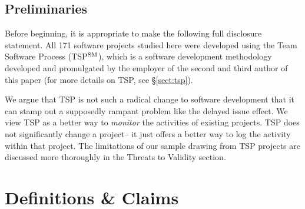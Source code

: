 \documentclass[smallcondensed]{svjour3}
\newcommand{\tion}[1]{\S\ref{sect:#1}}
\begin{document}
\subsection{Preliminaries}\label{sect:nontsp}
Before beginning, it is appropriate to make the following full disclosure statement. 
All 171 software projects
studied here were developed using the Team Software Process (TSP$\textsuperscript{SM}$), which is a software development methodology
developed and promulgated by the employer of the second and third author of this paper (for more details on TSP,
 see \tion{tsp}).

We argue that TSP is not such a radical change to software development that it can
stamp out a supposedly rampant problem like the delayed issue effect. We view TSP as a better way to
 {\em monitor} the activities   of  existing projects.  TSP
 does not significantly change a project-- it just offers a better way to log the activity within
 that project. The limitations of our sample drawing from TSP projects are discussed more thoroughly in the Threats to Validity section. 
 

 





 
\section{Definitions \& Claims}
\label{sect:claims}
\end{document}
